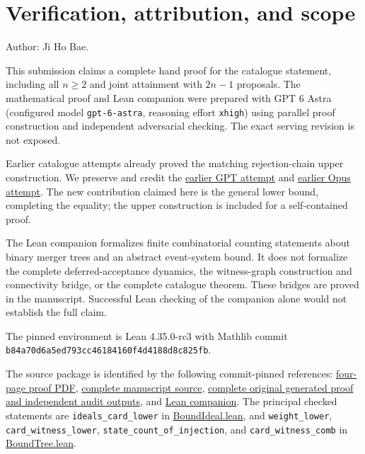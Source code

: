 \documentclass[11pt]{article}
\begin{document}
\section*{Verification, attribution, and scope}
Author: Ji Ho Bae.

This submission claims a complete hand proof for the catalogue statement,
including all $n\ge2$ and joint attainment with $2n-1$ proposals.
The mathematical proof and Lean companion were
prepared with GPT 6 Astra (configured model \texttt{gpt-6-astra}, reasoning
effort \texttt{xhigh}) using parallel proof construction and independent
adversarial checking. The exact serving revision is not exposed.

Earlier catalogue attempts already proved the matching rejection-chain
upper construction. We preserve and credit the
\href{https://github.com/mehmetmars7/Erdosproblems-llm-hunter/blob/00ced55ba1223fb48603e1f15028d753997ee515/attacks/open_problems/economics/gpt_6_astra_ultra/C78-352.tex}{earlier GPT attempt}
and
\href{https://github.com/mehmetmars7/Erdosproblems-llm-hunter/blob/00ced55ba1223fb48603e1f15028d753997ee515/attacks/open_problems/economics/opus_5.5_high/C78-352.tex}{earlier Opus attempt}.
The new contribution claimed here is the general lower bound, completing
the equality; the upper construction is included for a self-contained proof.

The Lean companion formalizes finite combinatorial counting statements
about binary merger trees and an abstract event-system bound. It does not
formalize the complete deferred-acceptance dynamics, the witness-graph
construction and connectivity bridge, or the complete catalogue theorem.
These bridges are proved in the manuscript. Successful Lean checking of
the companion alone would not establish the full claim.

The pinned environment is Lean 4.35.0-rc3 with Mathlib commit
\texttt{b84a70d6a5ed793cc46184160f4d4188d8c825fb}.

The source package is identified by the following commit-pinned references:
\href{https://github.com/jbaelaw/prime-da-state-counts/blob/eec79a6a79c77683811142c06c7c5cc71ad48bf6/paper/Proof.pdf}{four-page proof PDF},
\href{https://github.com/jbaelaw/prime-da-state-counts/blob/eec79a6a79c77683811142c06c7c5cc71ad48bf6/paper/Proof.tex}{complete manuscript source},
\href{https://github.com/jbaelaw/prime-da-state-counts/tree/eec79a6a79c77683811142c06c7c5cc71ad48bf6/provenance}{complete original generated proof and independent audit outputs},
and \href{https://github.com/jbaelaw/prime-da-state-counts/tree/eec79a6a79c77683811142c06c7c5cc71ad48bf6/lean}{Lean companion}.
The principal checked statements are \texttt{ideals\_card\_lower} in
\href{https://github.com/jbaelaw/prime-da-state-counts/blob/eec79a6a79c77683811142c06c7c5cc71ad48bf6/lean/BoundIdeal.lean}{BoundIdeal.lean}, and
\texttt{weight\_lower}, \texttt{card\_witness\_lower},
\texttt{state\_count\_of\_injection}, and \texttt{card\_witness\_comb} in
\href{https://github.com/jbaelaw/prime-da-state-counts/blob/eec79a6a79c77683811142c06c7c5cc71ad48bf6/lean/BoundTree.lean}{BoundTree.lean}.
\end{document}
